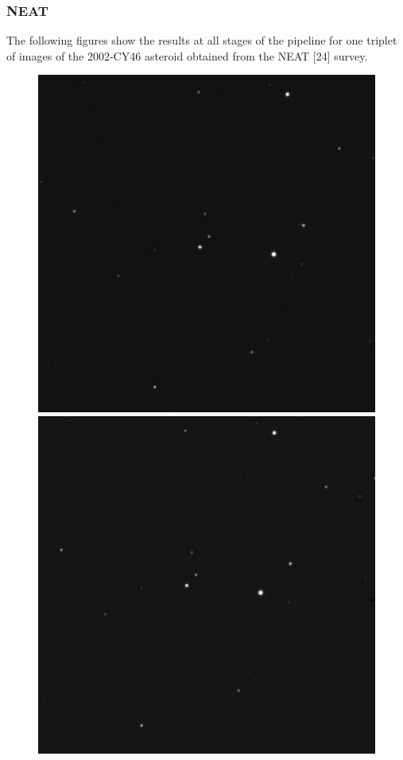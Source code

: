 \subsubsection{NEAT}
The following figures show the results at all stages of the pipeline for one triplet of images of the 2002-CY46 asteroid obtained from the NEAT [24] survey.  
\begin{figure}
  \includegraphics[width=\linewidth]{Figures/NEAT1.pdf}
\endminipage\hfill
{}
  \includegraphics[width=\linewidth]{Figures/NEAT2.pdf}

\end{figure}
